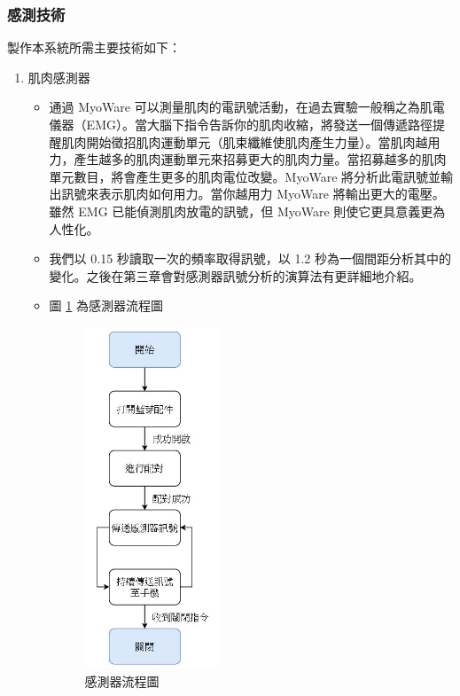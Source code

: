 \documentclass[12pt]{article}  %
\theoremstyle{plain}
\begin{document}
\subsubsection{感測技術}
製作本系統所需主要技術如下：
\begin{enumerate}
\item 肌肉感測器
\begin{itemize}
\item 通過 MyoWare 可以測量肌肉的電訊號活動，在過去實驗一般稱之為肌電儀器（EMG）。當大腦下指令告訴你的肌肉收縮，將發送一個傳遞路徑提醒肌肉開始徵招肌肉運動單元（肌束纖維使肌肉產生力量）。當肌肉越用力，產生越多的肌肉運動單元來招募更大的肌肉力量。當招募越多的肌肉單元數目，將會產生更多的肌肉電位改變。MyoWare 將分析此電訊號並輸出訊號來表示肌肉如何用力。當你越用力 MyoWare 將輸出更大的電壓。雖然 EMG 已能偵測肌肉放電的訊號，但 MyoWare 則使它更具意義更為人性化。
\item 我們以 0.15 秒讀取一次的頻率取得訊號，以 1.2 秒為一個間距分析其中的變化。之後在第三章會對感測器訊號分析的演算法有更詳細地介紹。
\item 圖 \ref{感測器流程圖} 為感測器流程圖
\begin{figure}[h]  %
\centering
\includegraphics[width=4cm]{pic/ch2/感測器流程圖.JPG}
\caption{感測器流程圖} \label{感測器流程圖}
\end{figure}
\end{itemize}


\end{enumerate}
\end{document}
